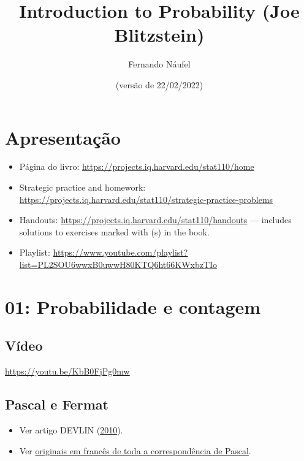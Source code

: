 \documentclass[
  11pt]{report}
\title{Introduction to Probability (Joe Blitzstein)}
\author{Fernando Náufel}
\date{(versão de 22/02/2022)}
\begin{document}
\maketitle

{
\setcounter{tocdepth}{1}
\tableofcontents
}
\hypertarget{apresentauxe7uxe3o}{%
\chapter*{Apresentação}\label{apresentauxe7uxe3o}}

\begin{itemize}
\item
  Página do livro: \url{https://projects.iq.harvard.edu/stat110/home}
\item
  Strategic practice and homework: \url{https://projects.iq.harvard.edu/stat110/strategic-practice-problems}
\item
  Handouts: \url{https://projects.iq.harvard.edu/stat110/handouts} --- includes solutions to exercises marked with (s) in the book.
\item
  Playlist: \url{https://www.youtube.com/playlist?list=PL2SOU6wwxB0uwwH80KTQ6ht66KWxbzTIo}
\end{itemize}

\hypertarget{probabilidade-e-contagem}{%
\chapter*{01: Probabilidade e contagem}\label{probabilidade-e-contagem}}

\hypertarget{vuxeddeo}{%
\section*{Vídeo}\label{vuxeddeo}}

\begin{center} \url{https://youtu.be/KbB0FjPg0mw} \end{center}

\hypertarget{pascal-e-fermat}{%
\section*{Pascal e Fermat}\label{pascal-e-fermat}}

\begin{itemize}
\item
  Ver artigo DEVLIN (\protect\hyperlink{ref-devlin-2010-pascal-fermat}{2010}).
\item
  Ver \href{https://gallica.bnf.fr/ark:/12148/bpt6k69975r.image.r=Blaise+Pascal.f233.langFR}{originais em francês de toda a correspondência de Pascal}.
\end{itemize}
\end{document}
